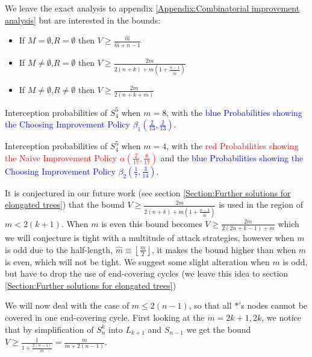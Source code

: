 \documentclass[a4paper,10pt]{article}
\newcommand{\floor}[1]{\left \lfloor #1 \right \rfloor}
\theoremstyle{definition}
\theoremstyle{definition}
\theoremstyle{remark}
\theoremstyle{definition}
\begin{document}
We leave the exact analysis to appendix \ref{Appendix:Combinatorial improvement analysis} but are interested in the bounds: 
\begin{itemize}
\item If $M=\emptyset$,$R=\emptyset$ then $V \geq \frac{\hat{m}}{\hat{m}+n-1}$
\item If $M \neq \emptyset$,$R=\emptyset$ then $V \geq \frac{2m}{2(n+k)+m(1+\frac{n-1}{\hat{m}})}$
\item If $M \neq \emptyset$,$R \neq \emptyset$ then $V \geq \frac{2m}{2(n+k+m)}$
\end{itemize}

\begin{myfigure}
\begin{center}

\end{center}
\caption{Interception probabilities of $S^5_{4}$ when $m=8$, with the \textcolor{blue}{blue Probabilities showing the Choosing Improvement Policy $\beta_{1} \left(\frac{2}{13},\frac{2}{13} \right)$}.}
\end{myfigure}

\begin{myfigure}
\begin{center}

\end{center}
\caption{Interception probabilities of $S^5_{4}$ when $m=4$, with the \textcolor{red}{red Probabilities showing the Naive Improvement Policy $\alpha \left(\frac{2}{17},\frac{6}{17} \right)$} and the \textcolor{blue}{blue Probabilities showing the Choosing Improvement Policy $\beta_{2} \left(\frac{1}{7},\frac{3}{14} \right)$}.}
\end{myfigure}

It is conjectured in our future work (see section \ref{Section:Further solutions for elongated trees}) that the bound $V \geq \frac{2m}{2(n+k)+m(1+\frac{n-1}{\hat{m}})}$ is used in the region of $m < 2(k+1)$. When $m$ is even this bound becomes $V \geq \frac{2m}{2(2n+k-1)+m}$ which we will conjecture is tight with a multitude of attack strategies, however when $m$ is odd due to the half-length, $\hat{m} \equiv \floor{\frac{m}{2}}$, it makes the bound higher than when $m$ is even, which will not be tight. We suggest some slight alteration when $m$ is odd, but have to drop the use of end-covering cycles (we leave this idea to section \ref{Section:Further solutions for elongated trees})

We will now deal with the case of $m \leq 2(n-1)$, so that all $*$'s nodes cannot be covered in one end-covering cycle. First looking at the $m=2k+1,2k$,  we notice that by simplification of $S^{k}_{n}$ into $L_{k+1}$ and $S_{n-1}$ we get the bound $V \geq \frac{1}{1+\frac{2(n-1)}{m}}=\frac{m}{m+2(n-1)}$.
\end{document}
